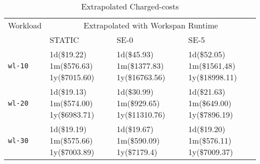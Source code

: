 


\begin{table}
\caption{Extrapolated Charged-costs}
\label{table_extrapolatedchargedcosts}
\centering
\begin{tabular}{|l|p{1.5cm}|p{1.5cm}|p{1.5cm}|}
\hline
Workload & \multicolumn{3}{|c|}{Extrapolated with Workspan Runtime}\\
\cline{2-4}
 & STATIC & SE-0 & SE-5 \\
\hline
\texttt{wl-10} &
1d(\$19.22) 1m(\$576.63) 1y(\$7015.60) &
1d(\$45.93) 1m(\$1377.83) 1y(\$16763.56) &
1d(\$52.05) 1m(\$1561,48) 1y(\$18998.11)\\
\hline
\texttt{wl-20} &
1d(\$19.13) 1m(\$574.00) 1y(\$6983.71) &
1d(\$30.99) 1m(\$929.65) 1y(\$11310.76) &
1d(\$21.63) 1m(\$649.00) 1y(\$7896.19) \\
\hline
\texttt{wl-30} &
1d(\$19.19) 1m(\$575.66) 1y(\$7003.89) &
1d(\$19.67) 1m(\$590.09) 1y(\$7179.4) &
1d(\$19.20) 1m(\$576.11) 1y(\$7009.37)\\
\hline
\end{tabular}
\end{table}
